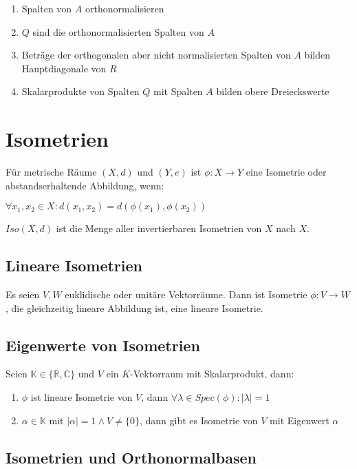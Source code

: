 \vspace*{-2mm}
\begin{enumerate}[leftmargin=4mm]
	\item Spalten von $A$ orthonormalisieren
	\item $Q$ sind die orthonormalisierten Spalten von $A$
	\item Beträge der orthogonalen aber nicht normalisierten Spalten von $A$ bilden Hauptdiagonale von $R$
	\item Skalarprodukte von Spalten $Q$ mit Spalten $A$ bilden obere Dreieckswerte
\end{enumerate}

\section*{Isometrien}

Für metrische Räume $(X, d)$ und $(Y, e)$ ist $\phi : X \rightarrow Y$ eine Isometrie oder abstandserhaltende Abbildung, wenn:

$\forall x_1, x_2 \in X : d(x_1, x_2) = d(\phi(x_1), \phi(x_2))$

$Iso(X, d)$ ist die Menge aller invertierbaren Isometrien von $X$ nach $X$.

\subsection*{Lineare Isometrien}

Es seien $V, W$ euklidische oder unitäre Vektorräume. Dann ist Isometrie $\phi : V \rightarrow W$, die gleichzeitig lineare Abbildung ist, eine lineare Isometrie.

\subsection*{Eigenwerte von Isometrien}

Seien $\mathbb{K} \in \{\mathbb{R}, \mathbb{C}\}$ und $V$ ein $K$-Vektorraum mit Skalarprodukt, dann:

\begin{enumerate}[label=(\alph*)]
	\item $\phi$ ist lineare Isometrie von $V$, dann $\forall \lambda \in Spec(\phi): |\lambda|=1$
	\item $\alpha \in \mathbb{K}$ mit $|\alpha|=1 \land V \neq \{0\}$, dann gibt es Isometrie von $V$ mit Eigenwert $\alpha$
\end{enumerate}

\subsection*{Isometrien und Orthonormalbasen}

